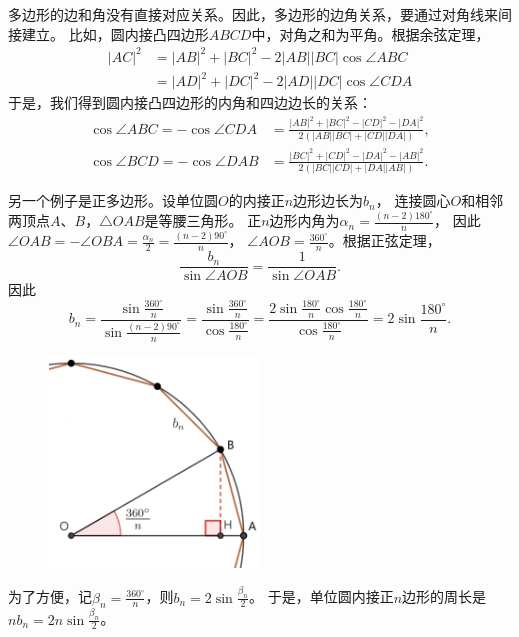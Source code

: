\documentclass[12pt,UTF8]{ctexbook}
\begin{document}
多边形的边和角没有直接对应关系。因此，多边形的边角关系，要通过对角线来间接建立。
比如，圆内接凸四边形$ABCD$中，对角之和为平角。根据余弦定理，
\begin{align*}
    |AC|^2 &= |AB|^2 + |BC|^2 -2|AB||BC|\cos\angle ABC  \\
    &= |AD|^2 + |DC|^2 -2|AD||DC|\cos\angle CDA 
\end{align*}
于是，我们得到圆内接凸四边形的内角和四边边长的关系：
\begin{align*}
    \cos\angle ABC = -\cos \angle CDA &= \frac{|AB|^2 + |BC|^2 - |CD|^2 - |DA|^2 }{2(|AB||BC| + |CD||DA|)},  \\
    \cos\angle BCD = -\cos \angle DAB &= \frac{|BC|^2 + |CD|^2 - |DA|^2 - |AB|^2 }{2(|BC||CD| + |DA||AB|)}.  
\end{align*}

另一个例子是正多边形。设单位圆$O$的内接正$n$边形边长为$b_n$，
连接圆心$O$和相邻两顶点$A$、$B$，$\triangle OAB$是等腰三角形。
正$n$边形内角为$\alpha_n = \frac{(n-2)180^\circ}{n}$，
因此$\angle OAB = -\angle OBA = \frac{\alpha_n}{2} = \frac{(n-2)90^\circ}{n}$，
$\angle AOB = \frac{360^\circ}{n}$。根据正弦定理，
$$ \frac{b_n}{\sin \angle AOB} = \frac{1}{\sin \angle OAB}.$$
因此
$$b_n = \frac{\sin \frac{360^\circ}{n}}{\sin \frac{(n-2)90^\circ}{n}} = \frac{\sin \frac{360^\circ}{n}}{\cos \frac{180^\circ}{n}} = \frac{2\sin \frac{180^\circ}{n}\cos \frac{180^\circ}{n}}{\cos \frac{180^\circ}{n}} = 2\sin \frac{180^\circ}{n}.$$

\begin{figure}[h] %
    \vspace{4pt}
    \centering
    \includegraphics[width=0.5\textwidth]{tu/圆内接多边形1.png}
\end{figure}

为了方便，记$\beta_n = \frac{360^\circ}{n}$，则$b_n = 2\sin \frac{\beta_n}{2}$。
于是，单位圆内接正$n$边形的周长是$nb_n = 2n\sin \frac{\beta_n}{2}$。
\end{document}
